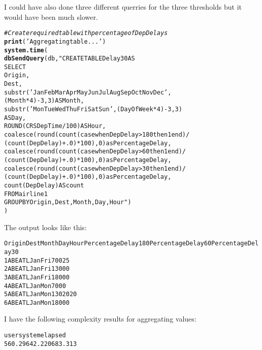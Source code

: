 \documentclass{llncs}\usepackage[]{graphicx}\usepackage[]{color}
\makeatletter
\newcommand{\hlstr}[1]{\textcolor[rgb]{0.192,0.494,0.8}{#1}}%
\newcommand{\hlcom}[1]{\textcolor[rgb]{0.678,0.584,0.686}{\textit{#1}}}%
\newcommand{\hlstd}[1]{\textcolor[rgb]{0.345,0.345,0.345}{#1}}%
\newcommand{\hlkwd}[1]{\textcolor[rgb]{0.737,0.353,0.396}{\textbf{#1}}}%
\newenvironment{kframe}{%
 \def\at@end@of@kframe{}%
 \ifinner\ifhmode%
  \def\at@end@of@kframe{\end{minipage}}%
  \begin{minipage}{\columnwidth}%
 \fi\fi%
 \def\FrameCommand##1{\hskip\@totalleftmargin \hskip-\fboxsep
 \colorbox{shadecolor}{##1}\hskip-\fboxsep
     \hskip-\linewidth \hskip-\@totalleftmargin \hskip\columnwidth}%
 \MakeFramed {\advance\hsize-\width
   \@totalleftmargin\z@ \linewidth\hsize
   \@setminipage}}%
 {\par\unskip\endMakeFramed%
 \at@end@of@kframe}
\newenvironment{knitrout}{}{} %
\makeatother
\begin{document}
I could have also done three different querries for the three thresholds but it would have been much slower.
\begin{knitrout}
\color{fgcolor}\begin{kframe}
\begin{alltt}
\hlcom{# Create required table with percentage of DepDelays}
\hlkwd{print}\hlstd{(}\hlstr{'Aggregating table...'}\hlstd{)}
\hlkwd{system.time}\hlstd{(}
\hlkwd{dbSendQuery}\hlstd{(db,}\hlstr{"CREATE TABLE Delay30 AS
  SELECT 
           Origin, 
           Dest,
           substr('Jan Feb Mar Apr May Jun Jul Aug Sep Oct Nov Dec ', 
(Month * 4) - 3, 3) AS Month,
           substr('Mon Tue Wed Thu Fri Sat Sun ', (DayOfWeek * 4) - 3, 3) 
AS Day,
           ROUND(CRSDepTime/100) AS Hour,
           coalesce(round(count(case when DepDelay > 180 then 1 end)/
(count(DepDelay)+.0)*100), 0) as PercentageDelay,
           coalesce(round(count(case when DepDelay > 60 then 1 end)/
(count(DepDelay)+.0)*100), 0) as PercentageDelay,
           coalesce(round(count(case when DepDelay > 30 then 1 end)/
(count(DepDelay)+.0)*100), 0) as PercentageDelay,
           count(DepDelay) AS count
           FROM airline1 
           GROUP BY Origin, Dest, Month, Day, Hour"}\hlstd{)}
\hlstd{)}
\end{alltt}
\end{kframe}
\end{knitrout}
The output looks like this:

\begin{knitrout}
\color{fgcolor}\begin{kframe}
\begin{alltt}
Origin Dest Month Day Hour PercentageDelay180 PercentageDelay60 PercentageDelay30
1    ABE  ATL   Jan Fri    7                  0                 0                25
2    ABE  ATL   Jan Fri   13                  0                 0                 0
3    ABE  ATL   Jan Fri   18                  0                 0                 0
4    ABE  ATL   Jan Mon    7                  0                 0                 0
5    ABE  ATL   Jan Mon   13                  0                20                20
6    ABE  ATL   Jan Mon   18                  0                 0                 0
\end{alltt}
\end{kframe}
\end{knitrout}
I have the following complexity results for aggregating values:
\begin{knitrout}
\color{fgcolor}\begin{kframe}
\begin{alltt}
   user  system elapsed 
560.296  42.220 683.313 
\end{alltt}
\end{kframe}
\end{knitrout}
\end{document}
